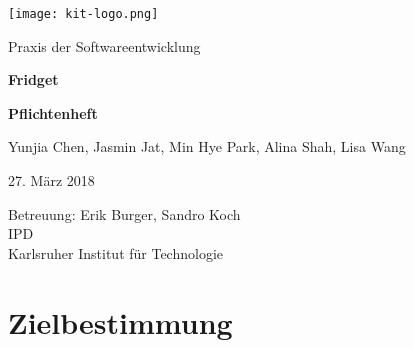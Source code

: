 \documentclass[a4paper]{scrreprt}
\begin{document}
    \begin{flushright}
        \texttt{[image: kit-logo.png]}\\[0.5cm]
    \end{flushright}
    \vspace*{2cm}

    \begin{center} 
    		\large Praxis der Softwareentwicklung
        \vspace*{1.5cm}

        \textbf{\huge Fridget}
        \vspace*{1cm}

        \textbf{\Large Pflichtenheft}
        \vspace*{2cm}

        Yunjia Chen, Jasmin Jat, Min Hye Park, Alina Shah, Lisa Wang
        \vspace*{1cm}

        27. März 2018
        \vspace*{2.5cm}

        Betreuung: Erik Burger, Sandro Koch\\[0.5cm]
        IPD\\[0.5cm]

        Karlsruher Institut für Technologie
    \end{center}
    \thispagestyle{empty}

    \tableofcontents

    \chapter{Zielbestimmung}
\end{document}
